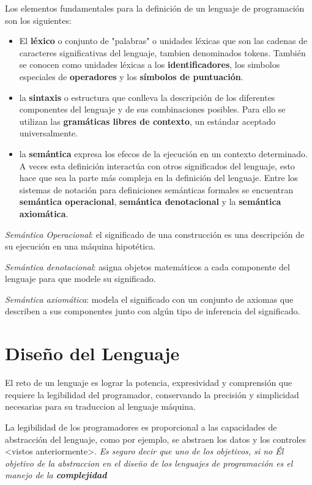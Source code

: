 \documentclass{article}
\begin{document}
Los elementos fundamentales para la definici\'on de un lenguaje de programaci\'on son los siguientes:
\begin{itemize}
\item El \textbf{l\'exico} o conjunto de "palabras" o unidades l\'exicas que son las cadenas de caracteres significativas del lenguaje, tambien denominados tokens. Tambi\'en se conocen como unidades l\'exicas a los \textbf{identificadores}, los simbolos especiales de \textbf{operadores} y los \textbf{s\'imbolos de puntuaci\'on}.

\item la \textbf{sintaxis} o estructura que conlleva la descripci\'on de los diferentes componentes del lenguaje y de sus combinaciones posibles. Para ello se utilizan las \textbf{gram\'aticas libres de contexto}, un est\'andar aceptado universalmente.

\item la \textbf{sem\'antica} expresa los efecos de la ejecuci\'on en un contexto determinado. A veces esta definici\'on interact\'ua con otros significados del lenguaje, esto hace que sea la parte m\'as compleja en la definici\'on del lenguaje.
Entre los sistemas de notaci\'on para definiciones sem\'anticas formales se encuentran \textbf{sem\'antica operacional}, \textbf{sem\'antica denotacional} y la \textbf{sem\'antica axiom\'atica}.
\end{itemize}

\textit{Sem\'antica Operacional}: el significado de una construcci\'on es una descripci\'on de su ejecuci\'on en una m\'aquina hipot\'etica.

\textit{Sem\'antica denotacional}: asigna objetos matem\'aticos a cada componente del lenguaje para que modele su significado.

\textit{Sem\'antica axiom\'atica}: modela el significado con un conjunto de axiomas que describen a sus componentes junto con alg\'un tipo de inferencia del significado.

\section{Dise\~{n}o del Lenguaje}
El reto de un lenguaje es lograr la potencia, expresividad y comprensi\'on que requiere la legibilidad del programador, conservando la precisi\'on y simplicidad necesarias para su traduccion al lenguaje m\'aquina.

La legibilidad de los programadores es proporcional a las capacidades de abstracci\'on del lenguaje, como por ejemplo, se abstraen los datos y los controles <vistos anteriormente>. \textit{Es seguro decir que uno de los objetivos, si no \'El objetivo de la abstraccion en el dise\~{n}o de los lenguajes de programaci\'on es el manejo de la \textbf{complejidad}}
\end{document}
